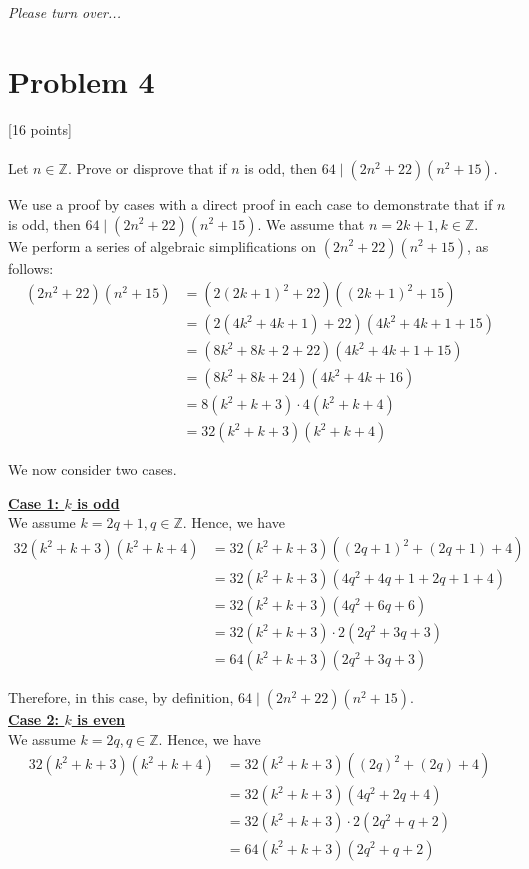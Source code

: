 \documentclass[answers]{exam}
\newcommand{\pt}[1]{\vspace{-0.8em}\textcolor{myDColor}{[#1 points]} \\\\}
\newenvironment{colored}[1][]{
    \bgroup\color{#1}
}{
\egroup\vspace{-0.8em}
}
\newcommand{\case}[1]{\noindent \textbf{\underline{#1}}\\}
\newenvironment{problem}[1][Problem]{\section*{\textcolor{myLColor}{#1}}}{\vspace{0.2em}}
\renewenvironment{solution}[1][]{\begin{answer}[#1]\begin{colored}[mySolColor]}{\end{colored}\end{answer}\vspace{1em}}
\newcommand{\pto}{
\begin{flushright}
    \textit{\textcolor{myDColor}{Please turn over...}}
\end{flushright}\pagebreak}
\begin{document}
\pto

\begin{problem}[Problem 4]
    \pt{16} Let $n \in \mathbb{Z}$. Prove or disprove that if $n$ is odd, then $64 \mid (2n^2 + 22)(n^2 + 15)$.
\end{problem}

\begin{solution}[by cases]
    \noindent We use a proof by cases with a direct proof in each case to demonstrate that if $n$ is odd, then $64 \mid (2n^2 + 22)(n^2 + 15)$. We assume that $n = 2k + 1, k \in \mathbb{Z}$.\\

    \noindent We perform a series of algebraic simplifications on $(2n^2 + 22)(n^2 + 15)$, as follows:
    \begin{align*}
        (2n^2 + 22)(n^2 + 15) &= (2(2k + 1)^2 + 22)((2k + 1)^2 + 15)\\
        &= (2(4k^2 + 4k + 1) + 22)(4k^2 + 4k + 1 + 15)\\
        &= (8k^2 + 8k + 2 + 22)(4k^2 + 4k + 1 + 15)\\
        &= (8k^2 + 8k + 24)(4k^2 + 4k + 16)\\
        &= 8(k^2 + k + 3) \cdot 4(k^2 + k + 4)\\
        &= 32(k^2 + k + 3)(k^2 + k + 4)
    \end{align*}

    \noindent We now consider two cases.

    \begin{mdframed}[backgroundcolor=myLColor!25]
    \case{Case 1: $k$ is odd}
    We assume $k = 2q + 1, q \in \mathbb{Z}$. Hence, we have
        \begin{align*}
        32(k^2 + k + 3)(k^2 + k + 4) &= 32(k^2 + k + 3)((2q + 1)^2 + (2q + 1) + 4)\\
        &= 32(k^2 + k + 3)(4q^2 + 4q + 1 + 2q + 1 + 4)\\
        &= 32(k^2 + k + 3)(4q^2 + 6q + 6)\\
        &= 32(k^2 + k + 3) \cdot 2(2q^2 + 3q + 3)\\
        &= 64(k^2 + k + 3)(2q^2 + 3q + 3)
    \end{align*}

    \noindent Therefore, in this case, by definition, $64 \mid (2n^2 + 22)(n^2 + 15)$.\\
    
    \case{Case 2: $k$ is even}
    We assume $k = 2q, q \in \mathbb{Z}$. Hence, we have
        \begin{align*}
        32(k^2 + k + 3)(k^2 + k + 4) &= 32(k^2 + k + 3)((2q)^2 + (2q) + 4)\\
        &= 32(k^2 + k + 3)(4q^2 + 2q + 4)\\
        &= 32(k^2 + k + 3) \cdot 2(2q^2 + q + 2)\\
        &= 64(k^2 + k + 3)(2q^2 + q + 2)
    \end{align*}


\end{mdframed}
\end{solution}
\end{document}
